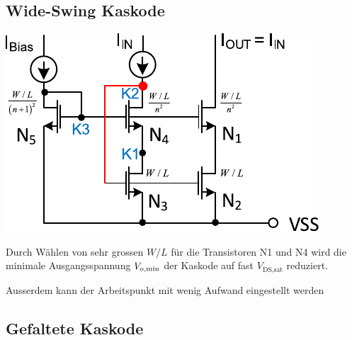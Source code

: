 \subsection{Wide-Swing Kaskode}

\begin{minipage}[t]{0.4\columnwidth}
    \includegraphics[width=\columnwidth, align=t]{images/07_wide_swing_kaskode.pdf}
\end{minipage}
\hfill
\begin{minipage}[t]{0.56\columnwidth}
    Durch Wählen von sehr grossen $W/L$ für die Transistoren N1 und N4 wird die minimale Ausgangsspannung $V_{\rm o, min}$ der Kaskode auf fast $V_\text{DS,sat}$ reduziert.
    
    Ausserdem kann der Arbeitspunkt mit wenig Aufwand eingestellt werden
\end{minipage}



\subsection{Gefaltete Kaskode}

